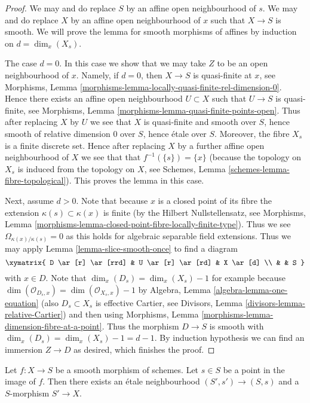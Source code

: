 \begin{proof}
We may and do replace $S$ by an affine open neighbourhood of $s$.
We may and do replace $X$ by an affine open neighbourhood of $x$
such that $X \to S$ is smooth.
We will prove the lemma for smooth morphisms of affines
by induction on $d = \dim_x(X_s)$.

\medskip\noindent
The case $d = 0$. In this case we show that we may take $Z$ to be
an open neighbourhood of $x$. Namely, if $d = 0$, then $X \to S$
is quasi-finite at $x$, see
Morphisms, Lemma \ref{morphisms-lemma-locally-quasi-finite-rel-dimension-0}.
Hence there exists an affine open neighbourhood $U \subset X$ such
that $U \to S$ is quasi-finite, see
Morphisms, Lemma \ref{morphisms-lemma-quasi-finite-points-open}.
Thus after replacing $X$ by $U$ we see that
$X$ is quasi-finite and smooth over $S$, hence
smooth of relative dimension $0$ over $S$, hence
\'etale over $S$. Moreover, the fibre $X_s$ is a finite
discrete set. Hence after replacing $X$ by a further affine open neighbourhood
of $X$ we see that that $f^{-1}(\{s\}) = \{x\}$ (because the topology
on $X_s$ is induced from the topology on $X$, see
Schemes, Lemma \ref{schemes-lemma-fibre-topological}).
This proves the lemma in this case.

\medskip\noindent
Next, assume $d > 0$. Note that because $x$ is a closed point of its
fibre the extension $\kappa(s) \subset \kappa(x)$ is finite (by the
Hilbert Nullstellensatz, see
Morphisms, Lemma \ref{morphisms-lemma-closed-point-fibre-locally-finite-type}).
Thus we see $\Omega_{\kappa(x)/\kappa(s)} = 0$ as this holds for
algebraic separable field extensions.
Thus we may apply
Lemma \ref{lemma-slice-smooth-once}
to find a diagram
$$
\xymatrix{
D \ar[r] \ar[rrd] & U \ar[r] \ar[rd] & X \ar[d] \\
& & S
}
$$
with $x \in D$. Note that
$\dim_x(D_s) = \dim_x(X_s) - 1$ for example because
$\dim(\mathcal{O}_{D_s, x}) = \dim(\mathcal{O}_{X_s, x}) - 1$ by
Algebra, Lemma \ref{algebra-lemma-one-equation}
(also $D_s \subset X_s$ is effective Cartier, see
Divisors, Lemma \ref{divisors-lemma-relative-Cartier})
and then using
Morphisms, Lemma \ref{morphisms-lemma-dimension-fibre-at-a-point}.
Thus the morphism $D \to S$ is smooth with
$\dim_x(D_s) = \dim_x(X_s) - 1 = d - 1$. By induction hypothesis
we can find an immersion $Z \to D$ as desired, which finishes the proof.
\end{proof}

\begin{lemma}
\label{lemma-etale-nbhd-dominates-smooth}
Let $f : X \to S$ be a smooth morphism of schemes.
Let $s \in S$ be a point in the image of $f$.
Then there exists an \'etale neighbourhood $(S', s') \to (S, s)$
and a $S$-morphism $S' \to X$.
\end{lemma}

